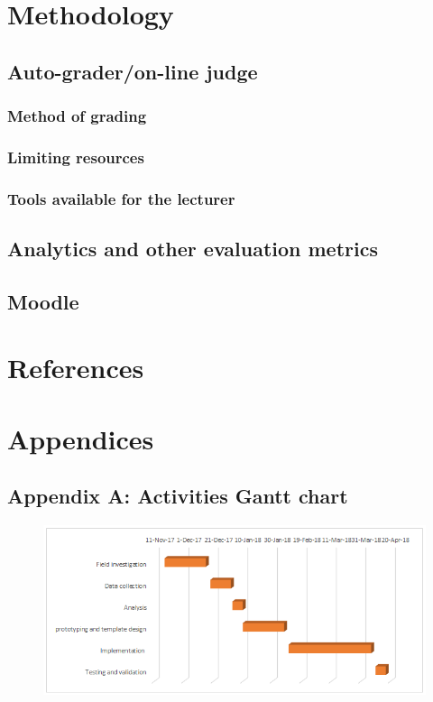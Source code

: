 \documentclass[12pt]{article}
\begin{document}
\section{Methodology}
	\subsection{Auto-grader/on-line judge}
		\subsubsection{Method of grading}
		\subsubsection{Limiting resources}
		\subsubsection{Tools available for the lecturer}
	\subsection{Analytics and other evaluation metrics}
	\subsection{Moodle}
\newpage
\section{References}


\newpage
\section{Appendices}
	\subsection{Appendix A: Activities Gantt chart}
	\begin{figure}[h]
		\begin{center} \includegraphics[width=1\linewidth]{gantt.png} \end{center}
	\end{figure}
\end{document}
